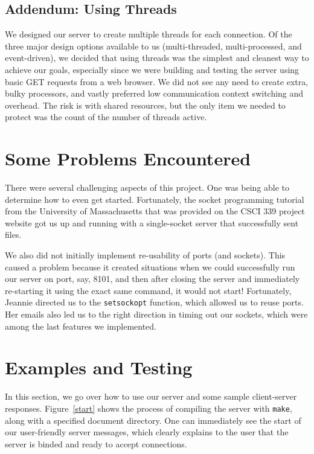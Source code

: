 \documentclass[letterpaper,11pt,twocolumn]{article}
\begin{document}
\subsection{Addendum: Using Threads}

We designed our server to create multiple threads for each connection. Of the three major design options available to us (multi-threaded,
multi-processed, and event-driven), we decided that using threads was the simplest and cleanest way to achieve our goals, especially since we were
building and testing the server using basic GET requests from a web browser. We did not see any need to create extra, bulky processors, and vastly
preferred low communication context switching and overhead. The risk is with shared resources, but the only item we needed to protect was the count of
the number of threads active.



\section{Some Problems Encountered}\label{problems}

There were several challenging aspects of this project. One was being able to determine how to even get started. Fortunately, the socket programming
tutorial from the University of Massachusetts that was provided on the CSCI 339 project website got us up and running with a single-socket server that
successfully sent files.

We also did not initially implement re-usability of ports (and sockets). This caused a problem because it created situations when we could successfully
run our server on port, say, 8101, and then after closing the server and immediately re-starting it using the exact same command, it would not start!
Fortunately, Jeannie directed us to the \texttt{setsockopt} function, which allowed us to reuse ports. Her emails also led us to the right direction
in timing out our sockets, which were among the last features we implemented.

\section{Examples and Testing}\label{testing}

In this section, we go over how to use our server and some sample client-server responses. Figure~\ref{start} shows the process of compiling the
server with \texttt{make}, along with a specified document directory. One can immediately see the start of our user-friendly server messages, which
clearly explains to the user that the server is binded and ready to accept connections.
\end{document}
